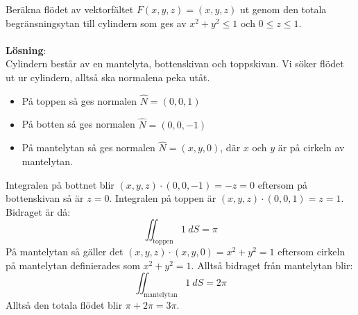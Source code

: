 \documentclass{report}
\begin{document}
\pagebreak
\ex{}
{
Beräkna flödet av vektorfältet $ F(x,y,z) = (x,y,z) $ ut genom den totala begränsningsytan till cylindern som ges av $ x^2+y^2 \le 1 $ och $ 0 \le z \le 1 $.\\\\

\textbf{Lösning}:\\
Cylindern består av en mantelyta, bottenskivan och toppskivan. Vi söker flödet ut ur cylindern, alltså ska normalena peka utåt.
\begin{itemize}
	\item På toppen så ges normalen $ \hat{N} = (0,0,1) $
	\item På botten så ges normalen $ \hat{N} = (0,0,-1) $
	\item På mantelytan så ges normalen $ \hat{N} = (x,y,0) $, där $ x $ och $ y $ är på cirkeln av mantelytan.
\end{itemize}
Integralen på bottnet blir $ (x,y,z) \cdot (0,0,-1) = -z = 0 $ eftersom på bottenskivan så är $ z = 0 $. Integralen på toppen är $ (x,y,z) \cdot (0,0,1) = z = 1 $. Bidraget är då:
\begin{equation*}
\iint_{ \text{toppen} }^{}  1\: dS = \pi 
\end{equation*}
På mantelytan så gäller det $ (x,y,z) \cdot (x,y,0) = x^2+y^2 = 1 $ eftersom cirkeln på mantelytan definierades som $ x^2+y^2 = 1 $. Alltså bidraget från mantelytan blir:
\begin{equation*}
\iint_{ \text{mantelytan}  }^{} 1 \: dS = 2\pi 
\end{equation*}
	Alltså den totala flödet blir $ \pi + 2\pi = 3\pi $.
}
\end{document}
